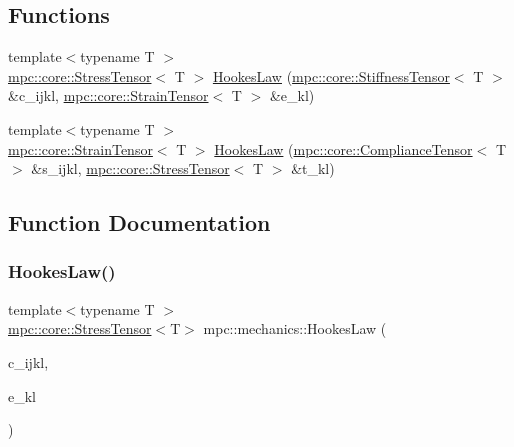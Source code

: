 \subsection*{Functions}
\begin{DoxyCompactItemize}
\item 
{\footnotesize template$<$typename T $>$ }\\\mbox{\hyperlink{structmpc_1_1core_1_1_stress_tensor}{mpc\+::core\+::\+Stress\+Tensor}}$<$ T $>$ \mbox{\hyperlink{namespacempc_1_1mechanics_ac0209e8d833d606783d3b6d7a2fc7e02}{Hookes\+Law}} (\mbox{\hyperlink{structmpc_1_1core_1_1_stiffness_tensor}{mpc\+::core\+::\+Stiffness\+Tensor}}$<$ T $>$ \&c\+\_\+ijkl, \mbox{\hyperlink{structmpc_1_1core_1_1_strain_tensor}{mpc\+::core\+::\+Strain\+Tensor}}$<$ T $>$ \&e\+\_\+kl)
\item 
{\footnotesize template$<$typename T $>$ }\\\mbox{\hyperlink{structmpc_1_1core_1_1_strain_tensor}{mpc\+::core\+::\+Strain\+Tensor}}$<$ T $>$ \mbox{\hyperlink{namespacempc_1_1mechanics_a769777e6d9b85dad0caae5a471deefe5}{Hookes\+Law}} (\mbox{\hyperlink{structmpc_1_1core_1_1_compliance_tensor}{mpc\+::core\+::\+Compliance\+Tensor}}$<$ T $>$ \&s\+\_\+ijkl, \mbox{\hyperlink{structmpc_1_1core_1_1_stress_tensor}{mpc\+::core\+::\+Stress\+Tensor}}$<$ T $>$ \&t\+\_\+kl)
\end{DoxyCompactItemize}


\subsection{Function Documentation}
\mbox{\label{namespacempc_1_1mechanics_ac0209e8d833d606783d3b6d7a2fc7e02}} 
\subsubsection{\texorpdfstring{Hookes\+Law()}{HookesLaw()}\hspace{0.1cm}{\footnotesize\ttfamily [1/2]}}
{\footnotesize\ttfamily template$<$typename T $>$ \\
\mbox{\hyperlink{structmpc_1_1core_1_1_stress_tensor}{mpc\+::core\+::\+Stress\+Tensor}}$<$T$>$ mpc\+::mechanics\+::\+Hookes\+Law (\begin{DoxyParamCaption}\item[{\mbox{\hyperlink{structmpc_1_1core_1_1_stiffness_tensor}{mpc\+::core\+::\+Stiffness\+Tensor}}$<$ T $>$ \&}]{c\+\_\+ijkl,  }\item[{\mbox{\hyperlink{structmpc_1_1core_1_1_strain_tensor}{mpc\+::core\+::\+Strain\+Tensor}}$<$ T $>$ \&}]{e\+\_\+kl }\end{DoxyParamCaption})}



